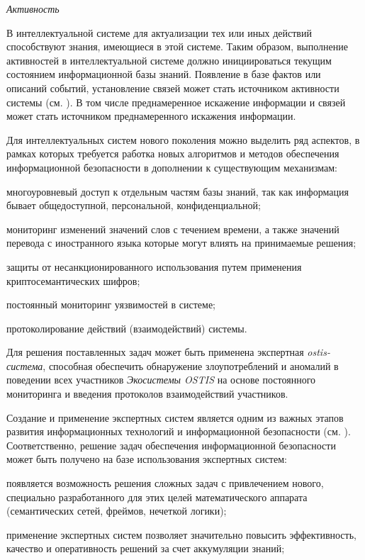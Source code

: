 \textit{Активность}

В интеллектуальной системе для актуализации тех или иных действий способствуют знания, имеющиеся в этой системе. Таким образом, выполнение активностей в интеллектуальной системе должно инициироваться текущим состоянием информационной базы знаний. Появление в базе фактов или описаний событий, установление связей может стать источником активности системы (см. ). В том числе преднамеренное искажение информации и связей может стать источником преднамеренного искажения информации.

Для интеллектуальных систем нового поколения можно выделить ряд аспектов, в рамках которых требуется работка новых алгоритмов и методов обеспечения информационной безопасности в дополнении к существующим механизмам:

\begin{textitemize}
	\item многоуровневый доступ к отдельным частям базы знаний, так как информация бывает общедоступной, персональной, конфиденциальной;
	\item мониторинг изменений значений слов с течением времени, а также значений перевода с иностранного языка которые могут влиять на принимаемые решения;
	\item защиты от несанкционированного использования путем применения криптосемантических шифров;
	\item постоянный мониторинг уязвимостей в системе;
	\item протоколирование действий (взаимодействий) системы.
\end{textitemize}

Для решения поставленных задач может быть применена экспертная \textit{ostis-система}, способная обеспечить обнаружение злоупотреблений и аномалий в поведении всех участников \textit{Экосистемы OSTIS} на основе постоянного мониторинга и введения протоколов взаимодействий участников.

Создание и применение экспертных систем является одним из важных этапов развития информационных технологий и информационной безопасности (см. ). Соответственно, решение задач обеспечения информационной безопасности может быть получено на базе использования экспертных систем:

\begin{textitemize}
	\item появляется возможность решения сложных задач с привлечением нового, специально разработанного для этих целей математического аппарата (семантических сетей, фреймов, нечеткой логики);
	\item применение экспертных систем позволяет значительно повысить эффективность, качество и оперативность решений за счет аккумуляции знаний;
\end{textitemize}

